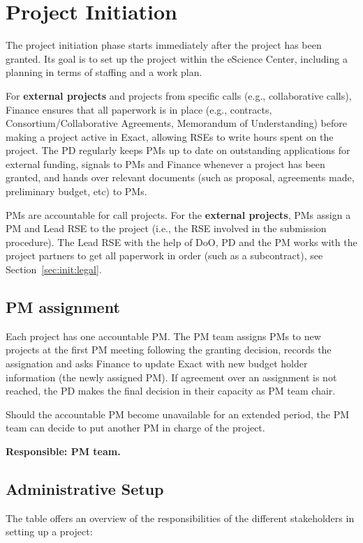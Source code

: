 \section{Project Initiation}
\label{sec:init}
The project initiation phase starts immediately after the project has been granted. Its goal is to set up the project
within the eScience Center, including a planning in terms of staffing and a work plan.

For \textbf{external projects} and projects from specific calls (e.g., collaborative calls), Finance ensures that all
paperwork is in place (e.g., contracts, Consortium/Collaborative Agreements, Memorandum of Understanding) before making
a project active in Exact, allowing RSEs to write hours spent on the project. The PD regularly keeps PMs up to date on
outstanding applications for external funding, signals to PMs and Finance whenever a project has been granted, and hands
over relevant documents (such as proposal, agreements made, preliminary budget, etc) to PMs. 

PMs are accountable for call projects. For the \textbf{external projects}, PMs assign a PM and Lead RSE to the project
(i.e., the RSE involved in the submission procedure). The Lead RSE with the help of DoO, PD and the PM works with the project partners
to get all paperwork in order (such as a subcontract), see Section~\ref{sec:init:legal}. 

\subsection{PM assignment}
\label{sec:init:pm-assign}
Each project has one accountable PM. The PM team assigns PMs to new projects at the first PM meeting following the
granting decision, records the assignation and asks Finance to update Exact with new budget holder information (the newly
assigned PM). If agreement over an assignment is not reached, the PD makes the final decision in their capacity as PM
team chair.

Should the accountable PM become unavailable for an extended period, the PM team can decide to put another PM in charge
of the project.

\textbf{Responsible: PM team.}

\subsection{Administrative Setup}
The table offers an overview of the responsibilities of the different stakeholders in setting up a project:

